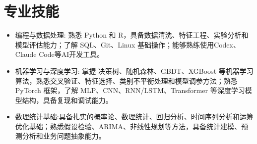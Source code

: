 \documentclass{resume}
\begin{document}
\section{专业技能}
\begin{itemize}[parsep=0.2ex]
  \item 编程与数据处理: 熟悉 Python 和 R，具备数据清洗、特征工程、实验分析和模型评估能力；了解 SQL、Git、Linux 基础操作；能够熟练使用Codex、Claude Code等AI开发工具。
  \item 机器学习与深度学习: 掌握 决策树、随机森林、GBDT、XGBoost 等机器学习算法，熟悉交叉验证、特征选择、类别不平衡处理和模型调参方法；熟悉 PyTorch 框架，了解 MLP、CNN、RNN/LSTM、Transformer 等深度学习模型结构，具备复现和调试能力。

  \item 数理统计基础:具备扎实的概率论、数理统计、回归分析、时间序列分析和运筹优化基础；熟悉假设检验、ARIMA、非线性规划等方法，具备统计建模、预测分析和业务问题抽象能力。
\end{itemize}



%
%
\end{document}
